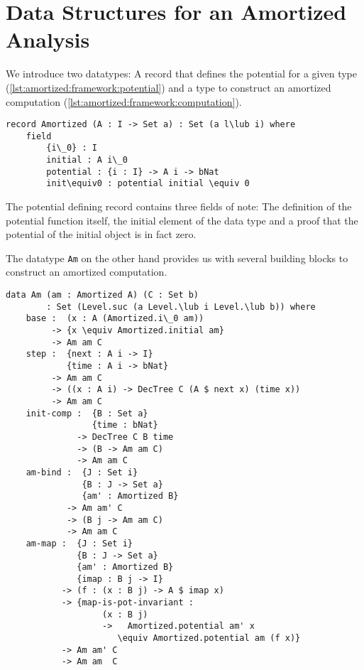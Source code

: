 \section{Data Structures for an Amortized Analysis}
We introduce two datatypes: A record that defines the potential for a given type (\autoref{lst:amortized:framework:potential}) and a type to construct an amortized computation (\autoref{lst:amortized:framework:computation}).

\begin{lstlisting}[caption={Record defining the potential for a type A},label={lst:amortized:framework:potential},emph={Amortized,initial,potential,init}]
record Amortized (A : I -> Set a) : Set (a l\lub i) where
    field
        {i\_0} : I
        initial : A i\_0
        potential : {i : I} -> A i -> bNat
        init\equiv0 : potential initial \equiv 0
\end{lstlisting}

The potential defining record contains three fields of note: The definition of the potential function itself, the initial element of the data type and a proof that the potential of the initial object is in fact zero.

The datatype \texttt{Am} on the other hand provides us with several building blocks to construct an amortized computation.

\begin{lstlisting}[caption={Building blocks of an amortized computation},label={lst:amortized:framework:computation},emph={Am,Amortized,base,init,comp,step,bind,map,initial,DecTree}]
data Am (am : Amortized A) (C : Set b)
        : Set (Level.suc (a Level.\lub i Level.\lub b)) where
    base :  (x : A (Amortized.i\_0 am))
         -> {x \equiv Amortized.initial am}
         -> Am am C
    step :  {next : A i -> I}
            {time : A i -> bNat}
         -> Am am C
         -> ((x : A i) -> DecTree C (A $ next x) (time x))
         -> Am am C
    init-comp :  {B : Set a}
                 {time : bNat}
              -> DecTree C B time
              -> (B -> Am am C)
              -> Am am C
    am-bind :  {J : Set i}
               {B : J -> Set a}
               {am' : Amortized B}
            -> Am am' C
            -> (B j -> Am am C)
            -> Am am C
    am-map :  {J : Set i}
              {B : J -> Set a}
              {am' : Amortized B}
              {imap : B j -> I}
           -> (f : (x : B j) -> A $ imap x)
           -> {map-is-pot-invariant :
                   (x : B j)
                   ->   Amortized.potential am' x
                      \equiv Amortized.potential am (f x)}
           -> Am am' C
           -> Am am  C
\end{lstlisting}

